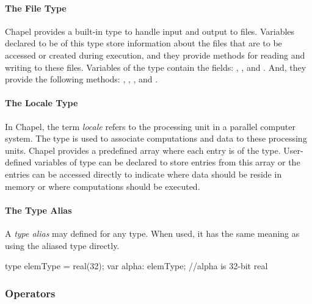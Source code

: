 \paragraph{The File Type}
Chapel provides a built-in  type to handle input and
output to files.  Variables declared to be of this type store
information about the files that are to be accessed or created during
execution, and they provide methods for reading and writing to these
files.  Variables of the  type contain the
fields:  , , and .
And, they provide the following methods:
, , ,  and .

\paragraph{The Locale Type}
In Chapel, the term {\em locale} refers to the processing unit in a parallel
computer system.  The  type is used to associate 
computations and data to these processing units.  Chapel provides
a predefined array  where each entry is of the 
type.  User-defined variables of  type can be declared to store 
entries from this  array or the entries can be accessed 
directly to indicate where data should be reside in memory or where computations
should be executed.   

\paragraph{The Type Alias}
A \emph{type alias} may defined for any type.  When used, it has the
same meaning as using the aliased type directly.
\begin{chapel}
type elemType = real(32);
var alpha: elemType; //alpha is 32-bit real
\end{chapel}

\subsubsection{Operators}
